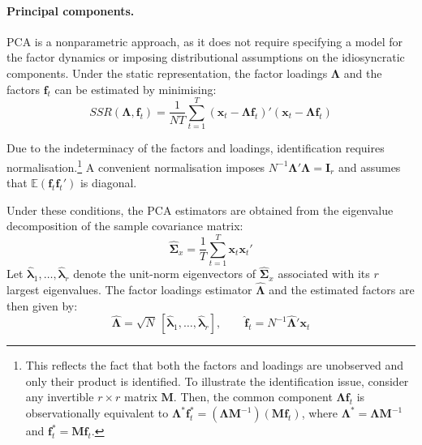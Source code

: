 \paragraph{Principal components.}

PCA is a nonparametric approach, as it does not require specifying a model for the factor dynamics or imposing distributional assumptions on the idiosyncratic components. Under the static representation, the factor loadings $\boldsymbol{\Lambda}$ and the factors $\boldsymbol{f}_t$ can be estimated by minimising:
\begin{equation}
SSR(\boldsymbol{\Lambda}, \boldsymbol{f}_t) = \frac{1}{NT} \sum_{t=1}^{T} (\boldsymbol{x}_t - \boldsymbol{\Lambda} \boldsymbol{f}_t)' (\boldsymbol{x}_t - \boldsymbol{\Lambda} \boldsymbol{f}_t)
\end{equation}

Due to the indeterminacy of the factors and loadings, identification requires normalisation.\footnote{This reflects the fact that both the factors and loadings are unobserved and only their product is identified. To illustrate the identification issue, consider any invertible $r \times r$ matrix $\boldsymbol{M}$. Then, the common component $\boldsymbol{\Lambda} \boldsymbol{f}_t$ is observationally equivalent to $\boldsymbol{\Lambda}^* \boldsymbol{f}_t^* = (\boldsymbol{\Lambda} \boldsymbol{M}^{-1})(\boldsymbol{M} \boldsymbol{f}_t)$, where $\boldsymbol{\Lambda}^* = \boldsymbol{\Lambda} \boldsymbol{M}^{-1}$ and $\boldsymbol{f}_t^* = \boldsymbol{M} \boldsymbol{f}_t$.} A convenient normalisation imposes $N^{-1}\boldsymbol{\Lambda}'\boldsymbol{\Lambda} = \boldsymbol{I}_r$ and assumes that $\mathbb{E}(\boldsymbol{f}_t \boldsymbol{f}_t')$ is diagonal.

Under these conditions, the PCA estimators are obtained from the eigenvalue decomposition of the sample covariance matrix:
\begin{equation}
\hat{\boldsymbol{\Sigma}}_x = \frac{1}{T} \sum_{t=1}^{T} \boldsymbol{x}_t \boldsymbol{x}_t'
\end{equation}
Let $\hat{\boldsymbol{\lambda}}_1, \dots, \hat{\boldsymbol{\lambda}}_r$ denote the unit-norm eigenvectors of $\hat{\boldsymbol{\Sigma}}_x$ associated with its $r$ largest eigenvalues. The factor loadings estimator $\hat{\boldsymbol{\Lambda}}$ and the estimated factors are then given by:
\begin{equation}
\hat{\boldsymbol{\Lambda}} = \sqrt{N}\,[\hat{\boldsymbol{\lambda}}_1, \dots, \hat{\boldsymbol{\lambda}}_r], \qquad \hat{\boldsymbol{f}}_t = N^{-1}\hat{\boldsymbol{\Lambda}}'\boldsymbol{x}_t
\end{equation}


